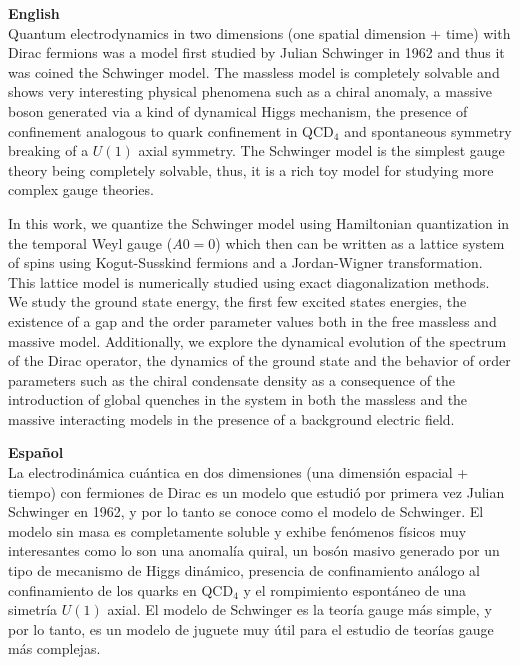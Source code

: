 \textbf{English}\\

Quantum electrodynamics in two dimensions (one spatial dimension + time) with Dirac fermions was a model first studied by Julian Schwinger in 1962 and thus it was coined the Schwinger model. The massless model is completely solvable and shows very interesting physical phenomena such as a chiral anomaly, a massive boson generated via a kind of dynamical Higgs mechanism,  the presence of confinement analogous to quark confinement in QCD$_4$ and spontaneous symmetry breaking of a $U(1)$ axial symmetry. The Schwinger model is the simplest gauge theory being completely solvable, thus, it is a rich toy model for studying more complex gauge theories.

In this work, we quantize the Schwinger model using Hamiltonian quantization in the temporal Weyl gauge ($A0=0$) which then can be written as a lattice system of spins using Kogut-Susskind fermions and a Jordan-Wigner transformation. This lattice model is numerically studied using exact diagonalization methods. We study the ground state energy,  the first few excited states energies, the existence of a gap and the order parameter values both in the free massless and massive model. Additionally, we explore the dynamical evolution of the spectrum of the Dirac operator, the dynamics of the ground state and the behavior of order parameters such as the chiral condensate density as a consequence of the introduction of global quenches in the system in both the massless and the massive interacting models in the presence of a background electric field.\vspace{30 pt}


\textbf{Español}\\

La electrodinámica cuántica en dos dimensiones (una dimensión espacial + tiempo) con fermiones de Dirac es un modelo que estudió por primera vez Julian Schwinger en 1962, y por lo tanto se conoce como el modelo de Schwinger. El modelo sin masa es completamente soluble y exhibe fenómenos físicos muy interesantes como lo son una anomalía quiral, un bosón masivo generado por un tipo de mecanismo de Higgs dinámico, presencia de confinamiento análogo al confinamiento de los quarks en QCD$_4$ y el rompimiento espontáneo de una simetría $U(1)$ axial. El modelo de Schwinger es la teoría gauge más simple, y por lo tanto, es un modelo de juguete muy útil para el estudio de teorías gauge más complejas.


